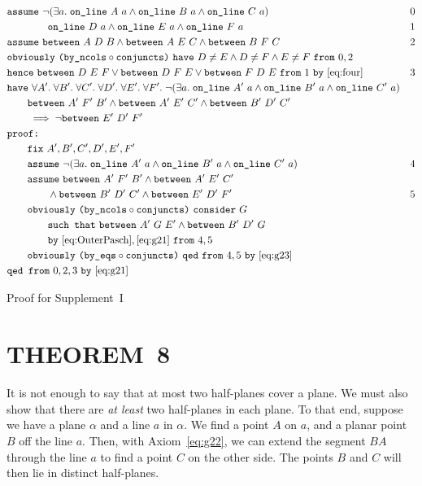 \begin{boxedfigure}
  \small
  \begin{align*}
    &\code{assume}\ \Triangle{a}{A}{B}{C} & 0\\
    &\qquad\qquad \code{on\_line}\ D\ a \wedge \code{on\_line}\ E\ a \wedge \code{on\_line}\ F\ a & 1\\
    &\code{assume}\ \between{A}{D}{B} \wedge \between{A}{E}{C} \wedge \between{B}{F}{C} & 2\\
    &\code{obviously}\ \code{(by\_ncols} \circ \code{conjuncts)}\ \code{have}\ D\neq E \wedge D\neq F \wedge E\neq F\ \code{from}\ 0,2\\
    &\code{hence}\ \between{D}{E}{F}\vee\between{D}{F}{E}\vee\between{F}{D}{E}\ \code{from}\ 1\ \code{by} \ \eqref{eq:four}&3\\
    &\code{have}\ \forall A'.\;\forall B'.\;\forall C'.\;\forall D'.\;\forall E'.\;\forall F'.\; \Triangle{a}{A'}{B'}{C'}\\
    &\qquad \between{A'}{F'}{B'} \wedge \between{A'}{E'}{C'} \wedge \between{B'}{D'}{C'}\\
    &\qquad \implies \neg\between{E'}{D'}{F'}\\ 
    &\code{proof:}\\
    &\qquad \code{fix}\ A',B',C',D',E',F'\\
    &\qquad \code{assume}\ \Triangle{a}{A'}{B'}{C'} & 4\\
    &\qquad \code{assume}\ \between{A'}{F'}{B'} \wedge \between{A'}{E'}{C'}\\ &\qquad\qquad\wedge\between{B'}{D'}{C'}\wedge\between{E'}{D'}{F'} & 5\\
    &\qquad\code{obviously}\ \code{(by\_ncols} \circ \code{conjuncts)}\ \code{consider}\ G\ \\ &\qquad\qquad\code{such that}\ \between{A'}{G}{E'} \wedge \between{B'}{D'}{G}\\ 
    &\qquad\qquad\code{by}\ \eqref{eq:OuterPasch},\eqref{eq:g21}\ \code{from}\ 4,5\\
    &\qquad\code{obviously}\ \code{(by\_eqs} \circ \code{conjuncts)}\  \code{qed}\ \code{from}\ 4,5\ \code{by}\ \eqref{eq:g23}\\
    &\code{qed from}\ 0,2,3\ \code{by}\ \eqref{eq:g21}
  \end{align*}
  \caption{Proof for Supplement~I}
  \label{fig:SupplementIProof}
\end{boxedfigure}
\section{THEOREM~8}
It is not enough to say that at most two half-planes cover a plane. We must also show that there are \emph{at least} two half-planes in each plane. To that end, suppose we have a plane $\alpha$ and a line $a$ in $\alpha$. We find a  point $A$ on $a$, and a planar point $B$ off the line $a$. Then, with Axiom~\ref{eq:g22}, we can extend the segment $BA$ through the line $a$ to find a point $C$ on the other side. The points $B$ and $C$ will then lie in distinct half-planes. 

